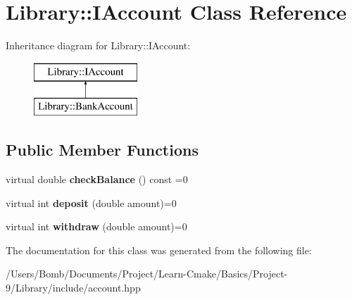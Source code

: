 \hypertarget{class_library_1_1_i_account}{}\section{Library\+:\+:I\+Account Class Reference}
\label{class_library_1_1_i_account}
Inheritance diagram for Library\+:\+:I\+Account\+:\begin{figure}[H]
\begin{center}
\leavevmode
\includegraphics[height=2.000000cm]{class_library_1_1_i_account}
\end{center}
\end{figure}
\subsection*{Public Member Functions}
\begin{DoxyCompactItemize}
\item 
\mbox{\label{class_library_1_1_i_account_a3eb1e12ae7fa2546e235a4a6c39e98f7}} 
virtual double {\bfseries check\+Balance} () const =0
\item 
\mbox{\label{class_library_1_1_i_account_a4697c7630dd8868076155bd4acf313ff}} 
virtual int {\bfseries deposit} (double amount)=0
\item 
\mbox{\label{class_library_1_1_i_account_a758940b9e9b312a2a16a155531d2820c}} 
virtual int {\bfseries withdraw} (double amount)=0
\end{DoxyCompactItemize}


The documentation for this class was generated from the following file\+:\begin{DoxyCompactItemize}
\item 
/\+Users/\+Bomb/\+Documents/\+Project/\+Learn-\/\+Cmake/\+Basics/\+Project-\/9/\+Library/include/account.\+hpp\end{DoxyCompactItemize}
